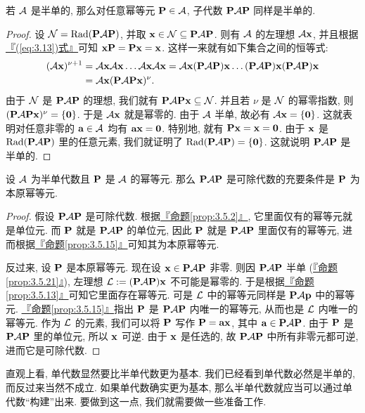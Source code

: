 \documentclass[lang=cn,zihao=-4,twoside,fontset=none]{textbook}
\def\eq#1{\[\begin{aligned}{}#1\end{aligned}\]}
\renewcommand{\eqref}[1]{\hyperref[#1]{『\textnormal{(\ref*{#1})}式』}}
\newcommand{\propref}[1]{\hyperref[#1]{『命题\textnormal{\ref*{#1}}』}}
\newcommand{\set}[1]{\{#1\}}
\newcommand{\bfnull}{\mathbf{0}}
\DeclareMathOperator{\Rad}{Rad}
\begin{document}
\begin{prop}
    \label{prop:3.5.21}%
    若 ${\mathcal A}$ 是半单的, 那么对任意幂等元 ${\mathbf P}\in{\mathcal A}$, 子代数 ${\mathbf P}{\mathcal A}{\mathbf P}$ 同样是半单的. 
\end{prop}

\begin{proof}
    设 $\mN=\Rad(\bfP\mA\bfP)$, 并取 ${\mathbf x}\in{\mathcal N}\subseteq{\mathbf P}{\mathcal A}{\mathbf P}$. 则有 ${\mathcal A}$ 的左理想 ${\mathcal A}{\mathbf x}$, 并且根据\eqref{eq:3.13}可知 ${\mathbf x}{\mathbf P}={\mathbf P}{\mathbf x}={\mathbf x}$. 这样一来就有如下集合之间的恒等式:
    \eq{
        (\mA\bfx)^{\nu+1}&=\mA\bfx\mA\bfx\dots\mA\bfx\mA\bfx=\mA\bfx(\bfP\mA\bfP)\bfx\dots(\bfP\mA\bfP)\bfx(\bfP\mA\bfP)\bfx \\
        &=\mA\bfx(\bfP\mA\bfP\bfx)^\nu.
    }
    由于 ${\mathcal N}$ 是 ${\mathbf P}{\mathcal A}{\mathbf P}$ 的理想, 我们就有 ${\mathbf P}{\mathcal A}{\mathbf P}{\mathbf x}\subseteq{\mathcal N}$. 并且若 $\nu$ 是 ${\mathcal N}$ 的幂零指数, 则 $(\bfP\mA\bfP\bfx)^\nu=\set{\bfnull}$. 于是 ${\mathcal A}{\mathbf x}$ 就是幂零的. 由于 ${\mathcal A}$ 半单, 故必有 $\mA\bfx=\set{\bfnull}$. 这就表明对任意非零的 ${\mathbf a}\in{\mathcal A}$ 均有 $\bfa\bfx=\bfnull$. 特别地, 就有 $\bfP\bfx=\bfx=\bfnull$. 由于 ${\mathbf x}$ 是 $\Rad(\bfP\mA\bfP)$ 里的任意元素, 我们就证明了 $\Rad(\bfP\mA\bfP)=\set{\bfnull}$. 这就说明 ${\mathbf P}{\mathcal A}{\mathbf P}$ 是半单的.
\end{proof}

\begin{prop}
    \label{prop:3.5.22}%
    设 ${\mathcal A}$ 为半单代数且 ${\mathbf P}$ 是 ${\mathcal A}$ 的幂等元. 那么 ${\mathbf P}{\mathcal A}{\mathbf P}$ 是可除代数的充要条件是 ${\mathbf P}$ 为本原幂等元.
\end{prop}
\begin{proof}
    假设 ${\mathbf P}{\mathcal A}{\mathbf P}$ 是可除代数. 根据\propref{prop:3.5.2}, 它里面仅有的幂等元就是单位元. 而 ${\mathbf P}$ 就是 ${\mathbf P}{\mathcal A}{\mathbf P}$ 的单位元, 因此 ${\mathbf P}$ 就是 ${\mathbf P}{\mathcal A}{\mathbf P}$ 里面仅有的幂等元, 进而根据\propref{prop:3.5.15}可知其为本原幂等元. 

    反过来, 设 ${\mathbf P}$ 是本原幂等元. 现在设 ${\mathbf x}\in{\mathbf P}{\mathcal A}{\mathbf P}$ 非零. 则因 ${\mathbf P}{\mathcal A}{\mathbf P}$ 半单 (\propref{prop:3.5.21}), 左理想 ${\mathcal L}:=({\mathbf P}{\mathcal A}{\mathbf P}){\mathbf x}$ 不可能是幂零的. 于是根据\propref{prop:3.5.13}可知它里面存在幂等元. 可是 ${\mathcal L}$ 中的幂等元同样是 ${\mathbf P}{\mathcal A}{\mathbf p}$ 中的幂等元. \propref{prop:3.5.15}指出 ${\mathbf P}$ 是 ${\mathbf P}{\mathcal A}{\mathbf P}$ 内唯一的幂等元, 从而也是 ${\mathcal L}$ 内唯一的幂等元. 作为 ${\mathcal L}$ 的元素, 我们可以将 ${\mathbf P}$ 写作 ${\mathbf P}={\mathbf a}{\mathbf x}$, 其中 ${\mathbf a}\in{\mathbf P}{\mathcal A}{\mathbf P}$. 由于 ${\mathbf P}$ 是 ${\mathbf P}{\mathcal A}{\mathbf P}$ 里的单位元, 所以 ${\mathbf x}$ 可逆. 由于 ${\mathbf x}$ 是任选的, 故 ${\mathbf P}{\mathcal A}{\mathbf P}$ 中所有非零元都可逆, 进而它是可除代数.
\end{proof}

直观上看, 单代数显然要比半单代数更为基本. 我们已经看到单代数必然是半单的, 而反过来当然不成立. 如果单代数确实更为基本, 那么半单代数就应当可以通过单代数``构建''出来. 要做到这一点, 我们就需要做一些准备工作. 
\end{document}
